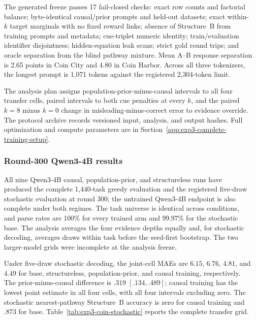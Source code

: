 The generated freeze passes 17 fail-closed checks: exact row counts and factorial
balance; byte-identical causal/prior prompts and held-out datasets; exact
within-$k$ target marginals with no fixed reward links; absence of Structure~B
from training prompts and metadata; cue-triplet numeric identity; train/evaluation
identifier disjointness; hidden-equation leak scans; strict gold round trips; and
oracle separation from the blind pathway mixture. Mean A--B response separation
is 2.65 points in Coin City and 4.80 in Coin Harbor. Across all three tokenizers,
the longest prompt is 1,071 tokens against the registered 2,304-token limit.

The analysis plan assigns population-prior-minus-causal intervals to all four
transfer cells, paired intervals to both cue penalties at every $k$, and the paired
$k=8$ minus $k=0$ change in misleading-minus-correct error to evidence override.
The protocol archive records versioned input, analysis, and output hashes. Full
optimization and compute parameters are in
Section~\ref{app:exp3-complete-training-setup}.

\subsubsection{Round-300 Qwen3-4B results}
\label{app:exp3-coin-qwen4b}

All nine Qwen3-4B causal, population-prior, and structureless runs have produced
the complete 1,440-task greedy evaluation and the registered five-draw stochastic
evaluation at round 300; the untrained Qwen3-4B endpoint is also complete under
both regimes. The task universe is identical across conditions, and parse rates
are 100\% for every trained arm and 99.97\% for the stochastic base. The analysis
averages the four evidence depths equally and, for stochastic decoding, averages
draws within task before the seed-first bootstrap. The two larger-model grids
were incomplete at the analysis freeze.

Under five-draw stochastic decoding, the joint-cell MAEs are $6.15$, $6.76$,
$4.81$, and $4.49$ for base, structureless, population-prior, and causal training,
respectively. The prior-minus-causal difference is $.319$ $[.134,.489]$; causal
training has the lowest point estimate in all four cells, with all four intervals
excluding zero. The stochastic nearest-pathway Structure~B accuracy is zero for
causal training and $.873$ for base. Table~\ref{tab:exp3-coin-stochastic} reports
the complete transfer grid.

